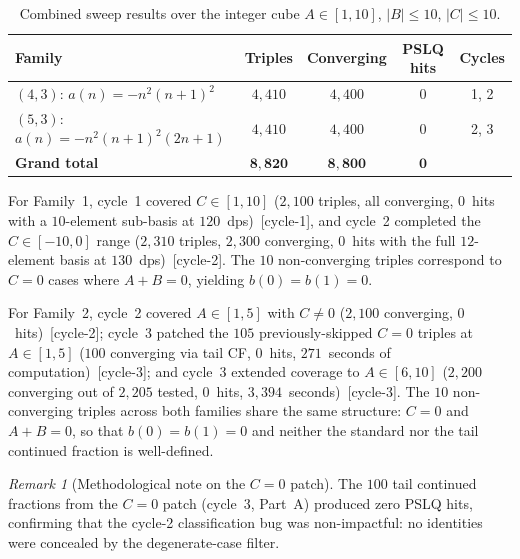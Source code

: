 \documentclass[11pt]{amsart}
\theoremstyle{plain}
\theoremstyle{remark}
\newtheorem{remark}{Remark}
\begin{document}
\begin{table}[ht]
\centering
\caption{Combined sweep results over the integer cube
  $A \in [1,10]$, $|B| \leq 10$, $|C| \leq 10$.}
\label{tab:main}
\begin{tabular}{@{}lcccc@{}}
\toprule
Family & Triples & Converging & PSLQ hits & Cycles \\
\midrule
$(4,3)$:\; $a(n) = -n^2(n{+}1)^2$
  & $4{,}410$ & $4{,}400$ & $0$ & 1, 2 \\[2pt]
$(5,3)$:\; $a(n) = -n^2(n{+}1)^2(2n{+}1)$
  & $4{,}410$ & $4{,}400$ & $0$ & 2, 3 \\
\midrule
\textbf{Grand total}
  & $\mathbf{8{,}820}$ & $\mathbf{8{,}800}$ & $\mathbf{0}$ & \\
\bottomrule
\end{tabular}
\end{table}

For Family~1, cycle~1 covered $C \in [1,10]$
($2{,}100$ triples, all converging, $0$~hits with a
$10$-element sub-basis at $120$~dps)~[cycle-1],
and cycle~2 completed the $C \in [-10,0]$ range
($2{,}310$ triples, $2{,}300$ converging, $0$~hits with the
full $12$-element basis at $130$~dps)~[cycle-2].
The $10$ non-converging triples correspond to
$C = 0$ cases where $A + B = 0$,
yielding $b(0) = b(1) = 0$.

For Family~2, cycle~2 covered $A \in [1,5]$ with $C \neq 0$
($2{,}100$ converging, $0$~hits)~[cycle-2];
cycle~3 patched the $105$ previously-skipped $C = 0$ triples
at $A \in [1,5]$
($100$ converging via tail CF, $0$~hits,
$271$~seconds of computation)~[cycle-3];
and cycle~3 extended coverage to $A \in [6,10]$
($2{,}200$ converging out of $2{,}205$ tested,
$0$~hits, $3{,}394$~seconds)~[cycle-3].
The $10$ non-converging triples across both families
share the same structure: $C = 0$ and $A + B = 0$,
so that $b(0) = b(1) = 0$ and neither the standard
nor the tail continued fraction is well-defined.

\begin{remark}[Methodological note on the $C = 0$ patch]
The $100$ tail continued fractions from the $C = 0$ patch
(cycle~3, Part~A) produced zero PSLQ hits,
confirming that the cycle-2 classification bug was non-impactful:
no identities were concealed by the degenerate-case filter.
\end{remark}
\end{document}
